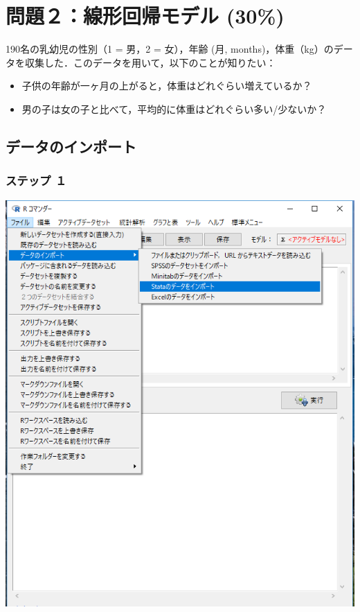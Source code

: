 \documentclass[11pt,]{problemset}
\begin{document}
\bigskip\bigskip\bigskip\bigskip\bigskip\bigskip\bigskip\bigskip

\hypertarget{-30}{%
\section{問題２：線形回帰モデル (30\%)}\label{-30}}

190名の乳幼児の性別（1 = 男，2 = 女），年齢 (月,
months)，体重（kg）のデータを収集した．このデータを用いて，以下のことが知りたい：

\begin{itemize}
\item
  子供の年齢が一ヶ月の上がると，体重はどれぐらい増えているか？
\item
  男の子は女の子と比べて，平均的に体重はどれぐらい多い/少ないか？
\end{itemize}

\subsection{データのインポート}

\subsubsection{ステップ １}

\begin{center}\includegraphics[width=0.8\linewidth]{pic/import00} \end{center}
\end{document}
